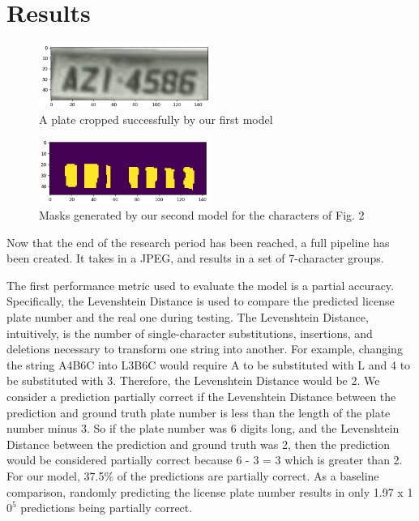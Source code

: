 \documentclass[conference]{IEEEtran}
\begin{document}
\section{Results}
\begin{figure}[h]
   \centering
   \includegraphics[width=0.5\textwidth]{plate.png}
   \caption{A plate cropped successfully by our first model}
   \label{fig:image_label}
\end{figure}
\begin{figure}[h]
   \centering
   \includegraphics[width=0.5\textwidth]{charMask.png}
   \caption{Masks generated by our second model for the characters of Fig. 2}
   \label{fig:image_label}
\end{figure}
Now that the end of the research period has been reached, a full pipeline has been created. It takes in a JPEG, and results in a set of 7-character groups.
\par
The first performance metric used to evaluate the model is a partial accuracy. Specifically, the Levenshtein Distance is used to compare the predicted license plate number and the real one during testing. The Levenshtein Distance, intuitively, is the number of single-character substitutions, insertions, and deletions necessary to transform one string into another. For example, changing the string A4B6C into L3B6C would require A to be substituted with L and 4 to be substituted with 3. Therefore, the Levenshtein Distance would be 2. We consider a prediction partially correct if the Levenshtein Distance between the prediction and ground truth plate number is less than the length of the plate number minus 3. So if the plate number was 6 digits long, and the Levenshtein Distance between the prediction and ground truth was 2, then the prediction would be considered partially correct because 6 - 3 = 3 which is greater than 2. For our model, 37.5\% of the predictions are partially correct. As a baseline comparison, randomly predicting the license plate number results in only 1.97 x 1$0^{5}$ predictions being partially correct.
\par
\end{document}
